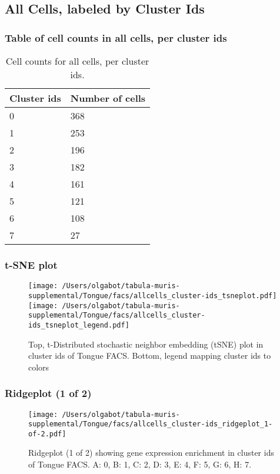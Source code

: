 \clearpage
\subsection{All Cells, labeled by Cluster Ids}
\subsubsection{Table of cell counts in all cells, per cluster ids}\begin{table}[h]
\centering
\label{my-label}
\begin{tabular}{@{}ll@{}}
\toprule

Cluster ids& Number of cells \\ \midrule
0 & 368 \\

1 & 253 \\

2 & 196 \\

3 & 182 \\

4 & 161 \\

5 & 121 \\

6 & 108 \\

7 & 27 \\
\bottomrule
\end{tabular}
\caption{Cell counts for all cells, per cluster ids.}
\end{table}

\clearpage
\subsubsection{t-SNE plot}
\begin{figure}[h]
\centering
\texttt{[image: /Users/olgabot/tabula-muris-supplemental/Tongue/facs/allcells\_cluster-ids\_tsneplot.pdf]}
\texttt{[image: /Users/olgabot/tabula-muris-supplemental/Tongue/facs/allcells\_cluster-ids\_tsneplot\_legend.pdf]}
\caption{Top, t-Distributed stochastic neighbor embedding (tSNE) plot  in cluster ids of Tongue FACS. Bottom, legend mapping cluster ids to colors}
\end{figure}


\clearpage
\clearpage
\subsubsection{Ridgeplot (1 of 2)}
\begin{figure}[h]
\centering
\texttt{[image: /Users/olgabot/tabula-muris-supplemental/Tongue/facs/allcells\_cluster-ids\_ridgeplot\_1-of-2.pdf]}

\caption{ Ridgeplot (1 of 2)  showing gene expression enrichment in cluster ids of Tongue FACS. A: 0, B: 1, C: 2, D: 3, E: 4, F: 5, G: 6, H: 7.}
\end{figure}


